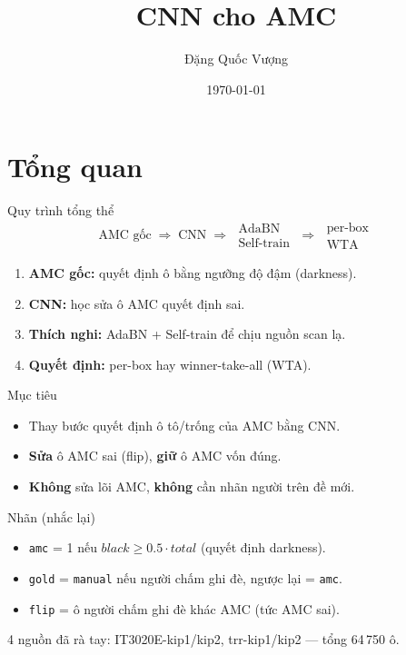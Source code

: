 \documentclass{beamer}
\title{CNN cho AMC}
\author{Đặng Quốc Vượng}
\institute{HUST}
\date{\today}
\newcommand{\hl}[1]{\textbf{#1}}
\begin{document}
\begin{frame}
    \titlepage
\end{frame}

\section{Tổng quan}

\begin{frame}{Quy trình tổng thể}
\large
\[
\text{AMC gốc} \;\Rightarrow\; \text{CNN} \;\Rightarrow\;
\begin{array}{c}\text{AdaBN}\\ \text{Self-train}\end{array} \;\Rightarrow\;
\begin{array}{c}\text{per-box}\\ \text{WTA}\end{array}
\]
\normalsize
\vspace{0.3cm}
\begin{enumerate}
    \item \hl{AMC gốc:} quyết định ô bằng ngưỡng độ đậm (darkness).
    \item \hl{CNN:} học sửa ô AMC quyết định sai.
    \item \hl{Thích nghi:} AdaBN + Self-train để chịu nguồn scan lạ.
    \item \hl{Quyết định:} per-box hay winner-take-all (WTA).
\end{enumerate}
\end{frame}

\begin{frame}{Mục tiêu}
\begin{itemize}
    \item Thay bước quyết định ô tô/trống của AMC bằng CNN.
    \item \hl{Sửa} ô AMC sai (flip), \hl{giữ} ô AMC vốn đúng.
    \item \hl{Không} sửa lõi AMC, \hl{không} cần nhãn người trên đề mới.
\end{itemize}
\end{frame}

\begin{frame}{Nhãn (nhắc lại)}
\begin{itemize}
    \item \texttt{amc} = 1 nếu $black \ge 0.5\cdot total$ (quyết định darkness).
    \item \texttt{gold} = \texttt{manual} nếu người chấm ghi đè, ngược lại = \texttt{amc}.
    \item \texttt{flip} = ô người chấm ghi đè khác AMC (tức AMC sai).
\end{itemize}
\vspace{0.3cm}
{\footnotesize 4 nguồn đã rà tay: IT3020E-kip1/kip2, trr-kip1/kip2 --- tổng 64\,750 ô.}
\end{frame}
\end{document}
